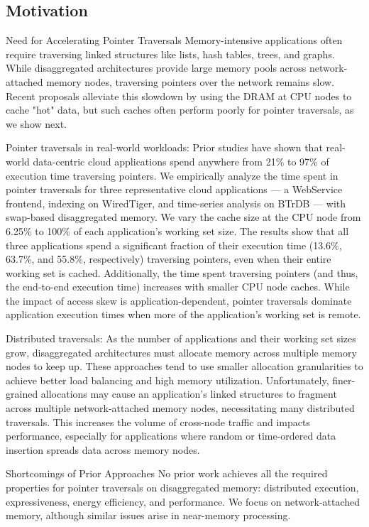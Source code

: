 \subsection{Motivation}
Need for Accelerating Pointer Traversals
Memory-intensive applications often require traversing linked structures like lists, hash tables, trees, and graphs. While disaggregated architectures provide large memory pools across network-attached memory nodes, traversing pointers over the network remains slow. Recent proposals alleviate this slowdown by using the DRAM at CPU nodes to cache "hot" data, but such caches often perform poorly for pointer traversals, as we show next.

Pointer traversals in real-world workloads: Prior studies have shown that real-world data-centric cloud applications spend anywhere from 21\% to 97\% of execution time traversing pointers. We empirically analyze the time spent in pointer traversals for three representative cloud applications — a WebService frontend, indexing on WiredTiger, and time-series analysis on BTrDB — with swap-based disaggregated memory. We vary the cache size at the CPU node from 6.25\% to 100\% of each application's working set size. The results show that all three applications spend a significant fraction of their execution time (13.6\%, 63.7\%, and 55.8\%, respectively) traversing pointers, even when their entire working set is cached. Additionally, the time spent traversing pointers (and thus, the end-to-end execution time) increases with smaller CPU node caches. While the impact of access skew is application-dependent, pointer traversals dominate application execution times when more of the application's working set is remote.

Distributed traversals: As the number of applications and their working set sizes grow, disaggregated architectures must allocate memory across multiple memory nodes to keep up. These approaches tend to use smaller allocation granularities to achieve better load balancing and high memory utilization. Unfortunately, finer-grained allocations may cause an application's linked structures to fragment across multiple network-attached memory nodes, necessitating many distributed traversals. This increases the volume of cross-node traffic and impacts performance, especially for applications where random or time-ordered data insertion spreads data across memory nodes.

Shortcomings of Prior Approaches
No prior work achieves all the required properties for pointer traversals on disaggregated memory: distributed execution, expressiveness, energy efficiency, and performance. We focus on network-attached memory, although similar issues arise in near-memory processing.

